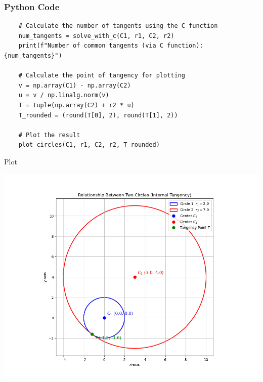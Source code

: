 \documentclass{beamer}
\begin{document}
     \begin{frame}[fragile]
        \frametitle{Python Code}
        \begin{lstlisting}
    # Calculate the number of tangents using the C function
    num_tangents = solve_with_c(C1, r1, C2, r2)
    print(f"Number of common tangents (via C function): {num_tangents}")

    # Calculate the point of tangency for plotting
    v = np.array(C1) - np.array(C2)
    u = v / np.linalg.norm(v)
    T = tuple(np.array(C2) + r2 * u)
    T_rounded = (round(T[0], 2), round(T[1], 2))

    # Plot the result
    plot_circles(C1, r1, C2, r2, T_rounded)
        \end{lstlisting}
    \end{frame}
    
    \begin{frame}{Plot}
        \begin{center}
            \includegraphics[width=\columnwidth, height=0.8\textheight, keepaspectratio]{figs/figure1.png}
        \end{center}
    \end{frame}
    
    
\end{document}
